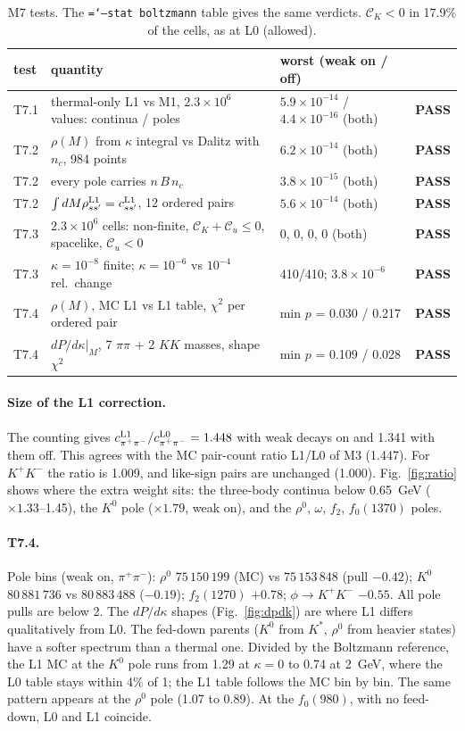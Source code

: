 \documentclass[11pt,a4paper]{article}
\newcommand{\CK}{\mathcal C_K}
\newcommand{\Cu}{\mathcal C_u}
\newcommand{\pass}{\textcolor{green!45!black}{\textbf{PASS}}}
\newcommand{\code}[1]{\texttt{\hyphenchar\font=`\-#1}}
\begin{document}
\begin{table}[H]
\centering\footnotesize
\begin{tabular}{llll}
\toprule
test & quantity & worst (weak on / off) & \\
\midrule
T7.1 & thermal-only L1 vs M1, $2.3\times10^6$ values: continua / poles & $5.9\times10^{-14}$ / $4.4\times10^{-16}$ (both) & \pass\\
T7.2 & $\rho(M)$ from $\kappa$ integral vs Dalitz with $n_c$, 984 points & $6.2\times10^{-14}$ (both) & \pass\\
T7.2 & every pole carries $n\,B\,n_c$ & $3.8\times10^{-15}$ (both) & \pass\\
T7.2 & $\int dM\rho^{\rm L1}_{ss'}=c^{\rm L1}_{ss'}$, 12 ordered pairs & $5.6\times10^{-14}$ (both) & \pass\\
T7.3 & $2.3\times10^6$ cells: non-finite, $\CK+\Cu\le0$, spacelike, $\Cu<0$ & 0, 0, 0, 0 (both) & \pass\\
T7.3 & $\kappa=10^{-8}$ finite; $\kappa=10^{-6}$ vs $10^{-4}$ rel.\ change & 410/410; $3.8\times10^{-6}$ & \pass\\
T7.4 & $\rho(M)$, MC L1 vs L1 table, $\chi^2$ per ordered pair & min $p$ = 0.030 / 0.217 & \pass\\
T7.4 & $dP/d\kappa|_M$, 7 $\pi\pi$ + 2 $KK$ masses, shape $\chi^2$ & min $p$ = 0.109 / 0.028 & \pass\\
\bottomrule
\end{tabular}
\caption{M7 tests. The \code{--stat boltzmann} table gives the same verdicts. $\CK<0$ in 17.9\% of
the cells, as at L0 (allowed).}
\end{table}

\paragraph{Size of the L1 correction.} The counting gives
$c^{\rm L1}_{\pi^+\pi^-}/c^{\rm L0}_{\pi^+\pi^-}=1.448$ with weak decays on and 1.341 with them off.
This agrees with the MC pair-count ratio L1/L0 of M3 (1.447). For $K^+K^-$ the ratio is 1.009, and
like-sign pairs are unchanged (1.000). Fig.~\ref{fig:ratio} shows where the extra weight sits: the
three-body continua below 0.65~GeV ($\times1.33$--1.45), the $K^0$ pole ($\times1.79$,
weak on), and the $\rho^0$, $\omega$, $f_2$, $f_0(1370)$ poles.

\paragraph{T7.4.} Pole bins (weak on, $\pi^+\pi^-$): $\rho^0$ $75\,150\,199$ (MC) vs
$75\,153\,848$ (pull $-0.42$); $K^0$ $80\,881\,736$ vs $80\,883\,488$ ($-0.19$); $f_2(1270)$ $+0.78$;
$\phi\to K^+K^-$ $-0.55$. All pole pulls are below 2. The $dP/d\kappa$ shapes (Fig.~\ref{fig:dpdk})
are where L1 differs qualitatively from L0. The fed-down parents ($K^0$ from $K^*$, $\rho^0$ from
heavier states) have a softer spectrum than a thermal one. Divided by the Boltzmann reference, the
L1 MC at the $K^0$ pole runs from 1.29 at $\kappa=0$ to 0.74 at 2~GeV, where the L0 table stays
within 4\% of 1; the L1 table follows the MC bin by bin. The same pattern appears at the $\rho^0$
pole (1.07 to 0.89). At the $f_0(980)$, with no feed-down, L0 and L1 coincide.
\end{document}
